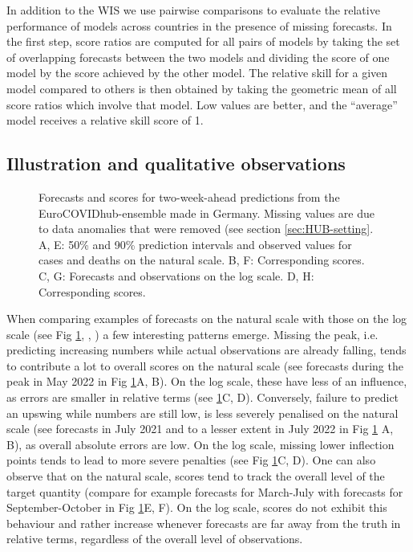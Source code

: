 \documentclass[10pt,letterpaper]{article}
\begin{document}
In addition to the WIS we use pairwise comparisons \cite{cramerEvaluationIndividualEnsemble2021} to evaluate the relative performance of models across countries in the presence of missing forecasts. In the first step, score ratios are computed for all pairs of models by taking the set of overlapping forecasts between the two models and dividing the score of one model by the score achieved by the other model. The relative skill for a given model compared to others is then obtained by taking the geometric mean of all score ratios which involve that model. Low values are better, and the ``average'' model receives a relative skill score of 1. 


\subsection*{Illustration and qualitative observations}

\begin{figure}[h!]
    \centering
    \caption{
    Forecasts and scores for two-week-ahead predictions from the EuroCOVIDhub-ensemble made in Germany. Missing values are due to data anomalies that were removed (see section \ref{sec:HUB-setting}. 
    A, E: 50\% and 90\% prediction intervals and observed values for cases and deaths on the natural scale. B, F: Corresponding scores. C, G: Forecasts and observations on the log scale. D, H: Corresponding scores. 
    }
    \label{fig:HUB-model-comparison-ensemble}
\end{figure}

When comparing examples of forecasts on the natural scale with those on the log scale (see Fig \ref{fig:HUB-model-comparison-ensemble}, , ) a few interesting patterns emerge. Missing the peak, i.e. predicting increasing numbers while actual observations are already falling, tends to contribute a lot to overall scores on the natural scale (see forecasts during the peak in May 2022 in Fig \ref{fig:HUB-model-comparison-ensemble}A, B). On the log scale, these have less of an influence, as errors are smaller in relative terms (see \ref{fig:HUB-model-comparison-ensemble}C, D). Conversely, failure to predict an upswing while numbers are still low, is less severely penalised on the natural scale (see forecasts in July 2021 and to a lesser extent in July 2022 in Fig \ref{fig:HUB-model-comparison-ensemble} A, B), as overall absolute errors are low. On the log scale, missing lower inflection points tends to lead to more severe penalties (see Fig \ref{fig:HUB-model-comparison-ensemble}C, D). One can also observe that on the natural scale, scores tend to track the overall level of the target quantity (compare for example forecasts for March-July with forecasts for September-October in Fig \ref{fig:HUB-model-comparison-ensemble}E, F). On the log scale, scores do not exhibit this behaviour and rather increase whenever forecasts are far away from the truth in relative terms, regardless of the overall level of observations. 
\end{document}
